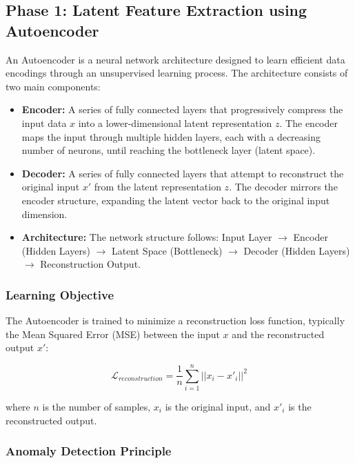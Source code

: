 \documentclass[12pt,a4paper]{article}
\begin{document}
\subsection{Phase 1: Latent Feature Extraction using Autoencoder}

An Autoencoder is a neural network architecture designed to learn efficient data encodings through an unsupervised learning process. The architecture consists of two main components:

\begin{itemize}
\item \textbf{Encoder:} A series of fully connected layers that progressively compress the input data $x$ into a lower-dimensional latent representation $z$. The encoder maps the input through multiple hidden layers, each with a decreasing number of neurons, until reaching the bottleneck layer (latent space).

\item \textbf{Decoder:} A series of fully connected layers that attempt to reconstruct the original input $x'$ from the latent representation $z$. The decoder mirrors the encoder structure, expanding the latent vector back to the original input dimension.

\item \textbf{Architecture:} The network structure follows: Input Layer $\to$ Encoder (Hidden Layers) $\to$ Latent Space (Bottleneck) $\to$ Decoder (Hidden Layers) $\to$ Reconstruction Output.
\end{itemize}

\subsubsection{Learning Objective}

The Autoencoder is trained to minimize a reconstruction loss function, typically the Mean Squared Error (MSE) between the input $x$ and the reconstructed output $x'$:

\begin{equation}
\mathcal{L}_{reconstruction} = \frac{1}{n}\sum_{i=1}^{n} ||x_i - x'_i||^2
\end{equation}

where $n$ is the number of samples, $x_i$ is the original input, and $x'_i$ is the reconstructed output.

\subsubsection{Anomaly Detection Principle}
\end{document}

